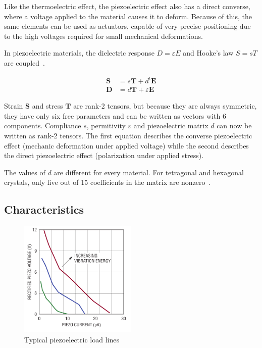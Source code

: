 \documentclass[a4paper,10pt]{article}
\renewcommand{\vec}{\mathbf}
\begin{document}
Like the thermoelectric effect, the piezoelectric effect also has a direct converse, where a voltage applied to the material causes it to deform. Because of this, the same elements can be used as actuators, capable of very precise positioning due to the high voltages required for small mechanical deformations. 

In piezoelectric materials, the dielectric response $D = \varepsilon E$ and Hooke's law $S = sT$ are coupled~\cite{wiki:piezo}. 

\begin{align}
 \vec S &= s \vec T + d^t \vec E \\
 \vec D &= d \vec T + \varepsilon \vec E
\end{align}

Strain $\vec S$ and stress $\vec T$ are rank-2 tensors, but because they are always symmetric, they have only six free parameters and can be written as vectors with 6 components. Compliance $s$, permitivity $\varepsilon$ and piezoelectric matrix $d$ can now be written as rank-2 tensors. The first equation describes the converse piezoelectric effect (mechanic deformation under applied voltage) while the second describes the direct piezoelectric effect (polarization under applied stress). 

The values of $d$ are different for every material. For tetragonal and hexagonal crystals, only five out of 15 coefficients in the matrix are nonzero~\cite{wiki:piezo}. 

\subsection{Characteristics}

\begin{figure}[h!]
\centering
  \includegraphics[width=0.5\textwidth]{./Slike/Piezo-UI}
\caption{Typical piezoelectric load lines~\cite{LT-Piezo}}
\label{fig:piezo-load}
\end{figure}
\end{document}
